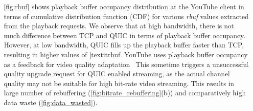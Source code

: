 \fig\ref{fig:rbuf} shows playback buffer occupancy distribution at the YouTube client in terms of cumulative distribution function (CDF) for various \textit{rbuf} values extracted from the playback requests. We observe that at high bandwidth, there is not much difference between TCP and QUIC in terms of playback buffer occupancy. However, at low bandwidth, QUIC fills up the playback buffer faster than TCP, resulting in higher values of ]textit{rbuf}. 
YouTube uses playback buffer occupancy as a feedback for video quality adaptation~\cite{mondal2017youtube,krishnappa2013dashing}
This sometime triggers a unsuccessful quality upgrade request for QUIC enabled streaming, as the actual channel quality may not be suitable for high bit-rate video streaming. This results in large number of rebuffering (\fig\ref{fig:bitrate_rebuffering}(b)) and comparatively high data waste (\fig\ref{fig:data_wasted}).



